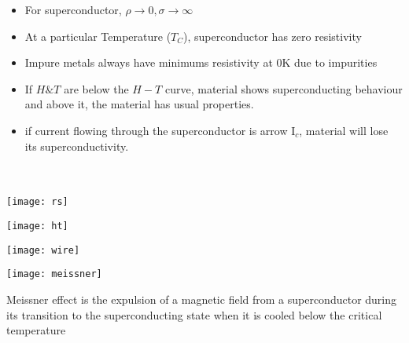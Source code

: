 \documentclass[12pt, a4paper]{article}
\begin{document}
\vspace{1cm}
\noparindent


\begin{minipage}[t][][b]{.67\textwidth}%
	\begin{itemize}
		\item For superconductor, $\rho \rightarrow 0, \sigma \rightarrow \infty$
		\item At a particular Temperature (${T_C}$), superconductor has zero resistivity
		\item Impure metals always have minimums resistivity at 0K due to impurities
		\item If $H \& T$ are below the $H-T$ curve, material shows superconducting behaviour and above it, the material has usual properties.
		\item if current flowing through the superconductor is arrow I$_c$, material will lose its superconductivity.\\
		      \medskip \\
		      \\
	\end{itemize}
\end{minipage}%
\hfill
\begin{minipage}[t][][b]{.3\textwidth}%
	\texttt{[image: rs]}

	\texttt{[image: ht]}

	\texttt{[image: wire]}
\end{minipage}


\texttt{[image: meissner]}

Meissner effect is the expulsion of a magnetic field from a superconductor during its transition to the superconducting state when it is cooled below the critical temperature

\end{document}

